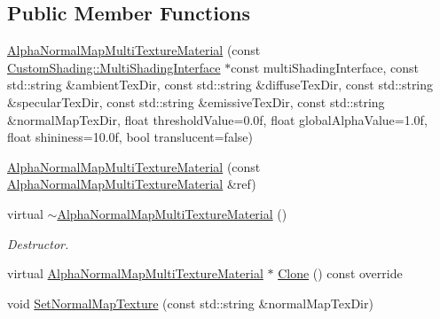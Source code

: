 \subsection*{Public Member Functions}
\begin{DoxyCompactItemize}
\item 
\mbox{\hyperlink{class_geometry_engine_1_1_geometry_material_1_1_alpha_normal_map_multi_texture_material_a88cf006f993687bbbd42a0c5255d8503}{Alpha\+Normal\+Map\+Multi\+Texture\+Material}} (const \mbox{\hyperlink{class_geometry_engine_1_1_custom_shading_1_1_multi_shading_interface}{Custom\+Shading\+::\+Multi\+Shading\+Interface}} $\ast$const multi\+Shading\+Interface, const std\+::string \&ambient\+Tex\+Dir, const std\+::string \&diffuse\+Tex\+Dir, const std\+::string \&specular\+Tex\+Dir, const std\+::string \&emissive\+Tex\+Dir, const std\+::string \&normal\+Map\+Tex\+Dir, float threshold\+Value=0.\+0f, float global\+Alpha\+Value=1.\+0f, float shininess=10.\+0f, bool translucent=false)
\item 
\mbox{\hyperlink{class_geometry_engine_1_1_geometry_material_1_1_alpha_normal_map_multi_texture_material_ac1010d4b924ed26b0a7570d855abfb25}{Alpha\+Normal\+Map\+Multi\+Texture\+Material}} (const \mbox{\hyperlink{class_geometry_engine_1_1_geometry_material_1_1_alpha_normal_map_multi_texture_material}{Alpha\+Normal\+Map\+Multi\+Texture\+Material}} \&ref)
\item 
\mbox{\label{class_geometry_engine_1_1_geometry_material_1_1_alpha_normal_map_multi_texture_material_a7757245795e387930803ceceecdc29ff}} 
virtual \mbox{\hyperlink{class_geometry_engine_1_1_geometry_material_1_1_alpha_normal_map_multi_texture_material_a7757245795e387930803ceceecdc29ff}{$\sim$\+Alpha\+Normal\+Map\+Multi\+Texture\+Material}} ()
\begin{DoxyCompactList}\small\item\em Destructor. \end{DoxyCompactList}\item 
virtual \mbox{\hyperlink{class_geometry_engine_1_1_geometry_material_1_1_alpha_normal_map_multi_texture_material}{Alpha\+Normal\+Map\+Multi\+Texture\+Material}} $\ast$ \mbox{\hyperlink{class_geometry_engine_1_1_geometry_material_1_1_alpha_normal_map_multi_texture_material_afa328c24595fe1456e87db7ad6df2759}{Clone}} () const override
\item 
void \mbox{\hyperlink{class_geometry_engine_1_1_geometry_material_1_1_alpha_normal_map_multi_texture_material_aeb7a6dd47e712e0d6c85d37e7158a615}{Set\+Normal\+Map\+Texture}} (const std\+::string \&normal\+Map\+Tex\+Dir)

\end{DoxyCompactItemize}
